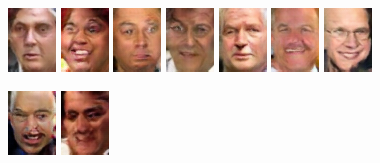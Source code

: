 \begin{figure}[!h]
{        \includegraphics[scale=1]{figures/lfw/appendix3/lfw64x48color_image0033.png}
        \includegraphics[scale=1]{figures/lfw/appendix3/lfw64x48color_image0034.png}
        \includegraphics[scale=1]{figures/lfw/appendix3/lfw64x48color_image0035.png}
        \includegraphics[scale=1]{figures/lfw/appendix3/lfw64x48color_image0036.png}
        \includegraphics[scale=1]{figures/lfw/appendix3/lfw64x48color_image0037.png}
        \includegraphics[scale=1]{figures/lfw/appendix3/lfw64x48color_image0038.png}
        \includegraphics[scale=1]{figures/lfw/appendix3/lfw64x48color_image0039.png}
    }
    \vspace{0.1cm}
    \centerline{
        \includegraphics[scale=1]{figures/lfw/appendix3/lfw64x48color_image0040.png}
        \includegraphics[scale=1]{figures/lfw/appendix3/lfw64x48color_image0041.png}
}
\end{figure}
